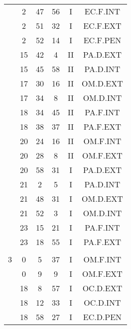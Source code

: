 \documentclass[12pt, a4paper]{article}
\begin{document}
\begin{multicols}{3}
{\begin{tabular}{c c c c c c}
	 	 	 	 & 2 & 47 & 56 & I & EC.F.INT\\%
	 	 	 	 & 2 & 51 & 32 & I & EC.F.EXT\\%
	 	 	 	 & 2 & 52 & 14 & I & EC.F.PEN\\%
	 	 	 	 & 15 & 42 & 4 & II & PA.D.EXT\\%
	 	 	 	 & 15 & 45 & 58 & II & PA.D.INT\\%
	 	 	 	 & 17 & 30 & 16 & II & OM.D.EXT\\%
	 	 	 	 & 17 & 34 & 8 & II & OM.D.INT\\%
	 	 	 	 & 18 & 34 & 45 & II & PA.F.INT\\%
	 	 	 	 & 18 & 38 & 37 & II & PA.F.EXT\\%
	 	 	 	 & 20 & 24 & 16 & II & OM.F.INT\\%
	 	 	 	 & 20 & 28 & 8 & II & OM.F.EXT\\%
	 	 	 	 & 20 & 58 & 31 & I & PA.D.EXT\\%
	 	 	 	 & 21 & 2 & 5 & I & PA.D.INT\\%
	 	 	 	 & 21 & 48 & 31 & I & OM.D.EXT\\%
	 	 	 	 & 21 & 52 & 3 & I & OM.D.INT\\%
	 	 	 	 & 23 & 15 & 21 & I & PA.F.INT\\%
	 	 	 	 & 23 & 18 & 55 & I & PA.F.EXT\\%
	 	 	 	 & & & & & \\%
	 	 	 	3 & 0 & 5 & 37 & I & OM.F.INT\\%
	 	 	 	 & 0 & 9 & 9 & I & OM.F.EXT\\%
	 	 	 	 & 18 & 8 & 57 & I & OC.D.EXT\\%
	 	 	 	 & 18 & 12 & 33 & I & OC.D.INT\\%
	 	 	 	 & 18 & 58 & 27 & I & EC.D.PEN\\%

\end{tabular}}
\end{multicols}
\end{document}
